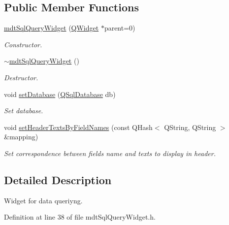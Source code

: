 \subsection*{Public Member Functions}
\begin{DoxyCompactItemize}
\item 
\hyperlink{classmdt_sql_query_widget_a164c6ea31fd4499109c6422f7a8f2bdf}{mdt\-Sql\-Query\-Widget} (\hyperlink{class_q_widget}{Q\-Widget} $\ast$parent=0)
\begin{DoxyCompactList}\small\item\em Constructor. \end{DoxyCompactList}\item 
\hyperlink{classmdt_sql_query_widget_a03a4c8f444655f35d91b1a1b58a13b85}{$\sim$mdt\-Sql\-Query\-Widget} ()
\begin{DoxyCompactList}\small\item\em Destructor. \end{DoxyCompactList}\item 
void \hyperlink{classmdt_sql_query_widget_a69de231c33149a9f01df0215a91cf0bd}{set\-Database} (\hyperlink{class_q_sql_database}{Q\-Sql\-Database} db)
\begin{DoxyCompactList}\small\item\em Set database. \end{DoxyCompactList}\item 
void \hyperlink{classmdt_sql_query_widget_a8ca0e1fbf8be78fe178ee1f2fc15522c}{set\-Header\-Texts\-By\-Field\-Names} (const Q\-Hash$<$ Q\-String, Q\-String $>$ \&mapping)
\begin{DoxyCompactList}\small\item\em Set correspondence between fields name and texts to display in header. \end{DoxyCompactList}\end{DoxyCompactItemize}


\subsection{Detailed Description}
Widget for data queriyng. 

Definition at line 38 of file mdt\-Sql\-Query\-Widget.\-h.



